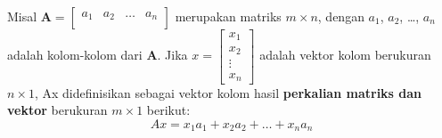 \begin{definisi}
    Misal $\textbf{A}=
    \begin{bmatrix}
    a_1 & a_2 & \dots & a_n \\    
    \end{bmatrix}$
    merupakan matriks $m \times n$, dengan $a_1$, $a_2$, \dots, $a_n$ adalah kolom-kolom dari $\textbf{A}$. Jika $x=
    \begin{bmatrix}
    x_1 \\
    x_2 \\
    \vdots \\
    x_n
    \end{bmatrix}$ adalah vektor kolom berukuran $n \times 1$, Ax didefinisikan sebagai vektor kolom hasil \textbf{perkalian matriks dan vektor} berukuran $m \times 1$ berikut:
    \begin{equation*}
        Ax = x_1a_1 + x_2a_2 + \dots + x_na_n
    \end{equation*}
\end{definisi}
